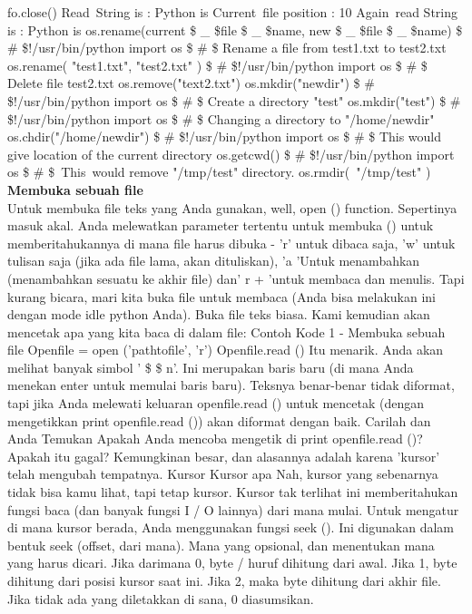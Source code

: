 fo.close() 
Read~String is :  Python is 
Current~file position :  10 
Again~read String is :  Python is 
os.rename(current \$  \_  \$file \$  \_  \$name, new \$  \_  \$file \$  \_  \$name) 
 \$  \#  \$!/usr/bin/python 
import os 
 \$  \#  \$ Rename a file from test1.txt to test2.txt 
os.rename( "test1.txt", "test2.txt" ) 
 \$  \#  \$!/usr/bin/python 
import os 
 \$  \#  \$ Delete file test2.txt  
os.remove("text2.txt") 
os.mkdir("newdir") 
 \$  \#  \$!/usr/bin/python 
import os 
 \$  \#  \$ Create a directory "test" 
os.mkdir("test") 
 \$  \#  \$!/usr/bin/python 
import os  
 \$  \#  \$ Changing a directory to "/home/newdir" 
os.chdir("/home/newdir")  
 \$  \#  \$!/usr/bin/python 
import os 
 \$  \#  \$ This would give location of the current directory 
os.getcwd() 
 \$  \#  \$!/usr/bin/python 
import os  
 \$  \#  \$~This~would  remove "/tmp/test"  directory.
os.rmdir(~"/tmp/test"  )  
{\fontsize{14pt}{14pt}\selectfont \textbf{Membuka sebuah file} \\}
Untuk membuka file teks yang Anda gunakan, well, open () function. Sepertinya masuk akal. Anda melewatkan parameter tertentu untuk membuka () untuk memberitahukannya di mana file harus dibuka - 'r' untuk dibaca saja, 'w' untuk tulisan saja (jika ada file lama, akan dituliskan), 'a 'Untuk menambahkan (menambahkan sesuatu ke akhir file) dan' r + 'untuk membaca dan menulis. Tapi kurang bicara, mari kita buka file untuk membaca (Anda bisa melakukan ini dengan mode idle python Anda). Buka file teks biasa. Kami kemudian akan mencetak apa yang kita baca di dalam file: 
Contoh Kode 1 - Membuka sebuah file  
Openfile = open ('pathtofile', 'r') 
Openfile.read ()
Itu menarik. Anda akan melihat banyak simbol ' \$  \setminus  \$ n'. Ini merupakan baris baru (di mana Anda menekan enter untuk memulai baris baru). Teksnya benar-benar tidak diformat, tapi jika Anda melewati keluaran openfile.read () untuk mencetak (dengan mengetikkan print openfile.read ()) akan diformat dengan baik. Carilah dan Anda Temukan Apakah Anda mencoba mengetik di print openfile.read ()? Apakah itu gagal? Kemungkinan besar, dan alasannya adalah karena 'kursor' telah mengubah tempatnya. Kursor Kursor apa Nah, kursor yang sebenarnya tidak bisa kamu lihat, tapi tetap kursor. Kursor tak terlihat ini memberitahukan fungsi baca (dan banyak fungsi I / O lainnya) dari mana mulai. Untuk mengatur di mana kursor berada, Anda menggunakan fungsi seek (). Ini digunakan dalam bentuk seek (offset, dari mana). Mana yang opsional, dan menentukan mana yang harus dicari. Jika darimana 0, byte / huruf dihitung dari awal. Jika 1, byte dihitung dari posisi kursor saat ini. Jika 2, maka byte dihitung dari akhir file. Jika tidak ada yang diletakkan di sana, 0 diasumsikan.  
